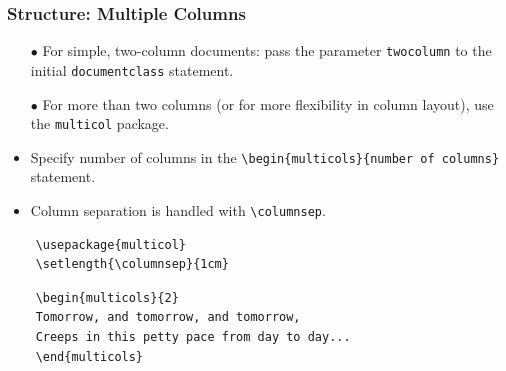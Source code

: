 \begin{frame}[fragile]
\frametitle{Structure: Multiple Columns}
\begin{itemize}
    \item[$\bullet$] For simple, two-column documents: pass the parameter \verb|twocolumn| to the initial \verb|documentclass| statement. \pause
    \item[$\bullet$] For more than two columns (or for more flexibility in column layout), use the \verb|multicol| package. \pause
    \item Specify number of columns in the \verb|\begin{multicols}{number of columns}| statement. \pause
    \item Column separation is handled with \verb|\columnsep|. \pause
\end{itemize}
\begin{exampleblock}{}
    \small
    \begin{verbatim}
    \usepackage{multicol}
    \setlength{\columnsep}{1cm}
    \end{verbatim}
\end{exampleblock}
\begin{exampleblock}{}
    \small
    \begin{verbatim}
    \begin{multicols}{2}
    Tomorrow, and tomorrow, and tomorrow,
    Creeps in this petty pace from day to day...
    \end{multicols}
    \end{verbatim}
\end{exampleblock}
\end{frame}



